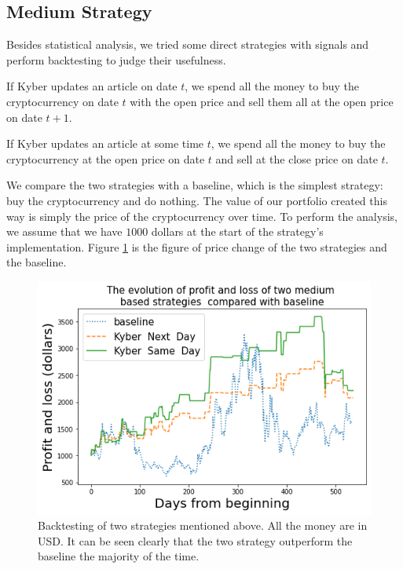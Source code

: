 \documentclass[twoside]{report}
\begin{document}
\begin{spacing}{1}
\subsection{Medium Strategy}
Besides statistical analysis, we tried some direct strategies with signals and perform backtesting to judge their usefulness. 

\begin{strategy}
If Kyber updates an article on date $t$, we spend all the money to buy the cryptocurrency on date $t$ with the open price and sell them all at the open price on date $t+1$.
\end{strategy}\label{strat:Kyber1}

\begin{strategy}
If Kyber updates an article at some time $t$, we spend all the money to buy the cryptocurrency at the open price on date $t$ and sell at the close price on date $t$.
\end{strategy}\label{strat:Kyber2} 

We compare the two strategies with a baseline, which is the simplest strategy: buy the cryptocurrency and do nothing. The value of our portfolio created this way is simply the price of the cryptocurrency over time. To perform the analysis, we assume that we have $1000$ dollars at the start of the strategy's implementation. Figure \ref{backtest medium} is the figure of price change of the two strategies and the baseline.

\begin{figure}[!h]
    \centering
    \includegraphics[scale =  0.65]{Images/medium backtesting.png}
    \caption{Backtesting of two strategies mentioned above. All the money are in USD. It can be seen clearly that the two strategy outperform the baseline the majority of the time.}
    \label{backtest medium}
\end{figure}


\end{spacing}
\end{document}
